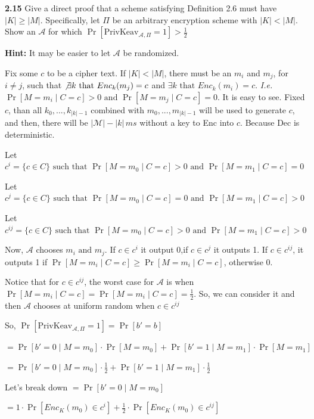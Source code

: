 \newpage
\noindent
\textbf{2.15} \hspace{1em}Give a direct proof that a scheme satisfying Definition 2.6 must have \( |K| \geq |M| \). Specifically, let \( \Pi \) be an arbitrary encryption scheme with \( |K| < |M| \). Show an \( \mathcal{A} \) for which $\Pr[\text{PrivKeav}_{\mathcal{A}, \Pi} = 1] > \frac{1}{2}$

\textbf{Hint:} It may be easier to let \( \mathcal{A} \) be randomized.
\vspace{1em}

Fix some $c$ to be a cipher text. If $|K| < |M|$, there must be an $m_i$ and $m_j$, for $i \ne j$, such that $\not\exists k \text{ that } Enc_k(m_j) = c$ and  $\exists k \text{ that } Enc_k(m_i) = c$. \textit{I.e.} $\Pr[M = m_i \mid C = c] > 0 \text{ and } \Pr[M = m_j \mid C = c] = 0$. It is easy to see. Fixed $c$, than all $k_0, ..., k_{|k|-1}$ combined with  $m_0, ..., m_{|k|-1}$ will be used to generate  $c$, and then, there will be $|\mathcal{M}|-|k| \, ms$ without a key to Enc into $c$. Because Dec is deterministic. 

Let $c^i = \{c \in C\} \text{ such that } \Pr[M = m_0 \mid C = c] > 0 \text{ and } \Pr[M = m_1 \mid C = c] = 0$

Let $c^j = \{c \in C\} \text{ such that } \Pr[M = m_0 \mid C = c] = 0 \text{ and } \Pr[M = m_1 \mid C = c] > 0$

Let $c^{ij} = \{c \in C\} \text{ such that } \Pr[M = m_0 \mid C = c] > 0 \text{ and } \Pr[M = m_1 \mid C = c] >0$

Now, $\mathcal{A}$ chooses $m_i \text{ and } m_j$. If $c \in c^i$ it output 0,if $c \in c^j$ it outputs 1. If $c \in c^{ij} $, it outputs 1 if $\Pr[M = m_i \mid C = c] \ge \Pr[M = m_i \mid C = c]$, otherwise 0.

Notice that for $c \in c^{ij}$, the worst case for $\mathcal{A}$ is when $\Pr[M = m_i \mid C = c] = \Pr[M = m_i \mid C = c] =  \frac{1}{2}$. So, we can consider it and then $\mathcal{A}$ chooses at uniform random when $c \in c^{ij}$

So, $\Pr[\text{PrivKeav}_{\mathcal{A}, \Pi} = 1] = \Pr[b' = b]$

$=\Pr[b' = 0 \mid M = m_0]\cdot\Pr[M = m_0] + \Pr[b' = 1 \mid M = m_1]\cdot\Pr[M = m_1]$

$=\Pr[b' = 0 \mid M = m_0]\cdot\frac{1}{2} + \Pr[b' = 1 \mid M = m_1]\cdot\frac{1}{2}$

Let's break down $=\Pr[b' = 0 \mid M = m_0]$

$=1 \cdot \Pr[Enc_K(m_0) \in c^{i}]  + \frac{1}{2} \cdot \Pr[Enc_K(m_0) \in c^{ij}]$

